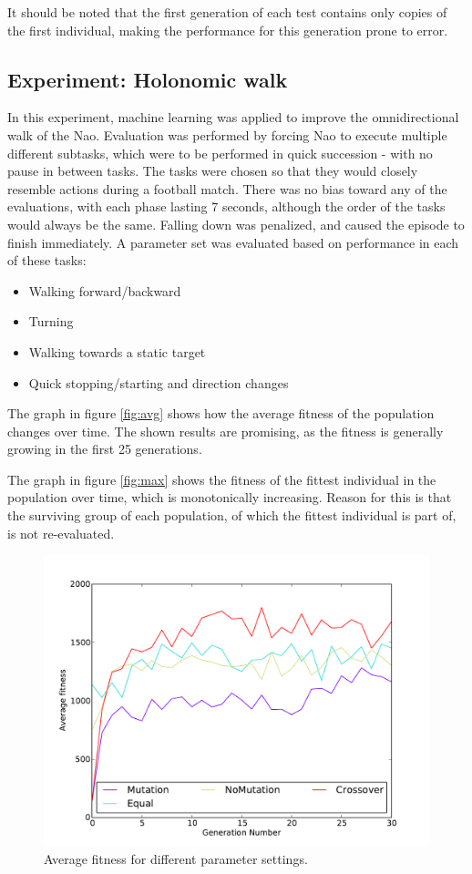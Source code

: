 \documentclass{article}
\begin{document}
It should be noted that the first generation of each test contains only copies of the first individual, making 
the performance for this generation prone to error. 


\subsection{Experiment: Holonomic walk}
In this experiment, machine learning was applied to improve the omnidirectional walk of the Nao. Evaluation was performed by forcing Nao to execute multiple different subtasks, which were to be performed in quick succession - with no pause in between tasks. The tasks were chosen so that they would closely resemble actions during a football match. There was no bias toward any of the evaluations, with each phase lasting 7 seconds, although the order of the tasks would always be the same. Falling down was penalized, and caused the episode to finish immediately. A parameter set was evaluated based on performance in each of these tasks:
\begin{itemize}
\item Walking forward/backward
\item Turning
\item Walking towards a static target
\item Quick stopping/starting and direction changes
\end{itemize}

The graph in figure \ref{fig:avg} shows how the average fitness of the population changes over time. The shown results are promising, as the fitness is generally growing in the first 25 generations. 

The graph in figure \ref{fig:max} shows the fitness of the fittest individual in the population over time, which is monotonically increasing. Reason for this is that the surviving group of each population, of which the fittest individual is part of, is not re-evaluated. 

\begin{figure}[h!]
	\center
	\includegraphics[width=.7\textwidth]{images/relevant_avg.pdf}
	\caption{Average fitness for different parameter settings.}
	\label{fig:avgforward}
\end{figure}
\end{document}

